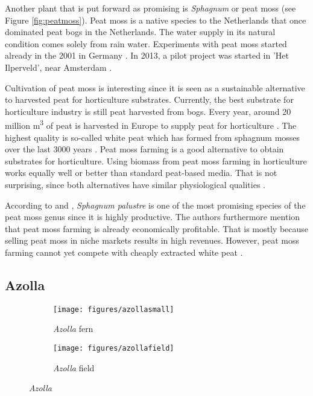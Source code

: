 \documentclass[a4paper,12pt]{scrbook}
\begin{document}
Another plant that is put forward as promising is \textit{Sphagnum} or peat moss (see Figure \ref{fig:peatmoss}). Peat moss is a native species to the Netherlands that once dominated peat bogs in the Netherlands. The water supply in its natural condition comes solely from rain water. Experiments with peat moss started already in the 2001 in Germany \citep{gaudig2014sphagnum}. In 2013, a pilot project was started in 'Het Ilperveld', near Amsterdam \citep{van2013werk}. 

Cultivation of peat moss is interesting since it is seen as a sustainable alternative to harvested peat for horticulture substrates. Currently, the best substrate for horticulture industry is still peat harvested from bogs. Every year, around 20 million m\textsuperscript{3} of peat is harvested in Europe to supply peat for horticulture \citep{altmann2008socio}. The highest quality is so-called white peat which has formed from sphagnum mosses over the last 3000 years \citep{gaudig2014sphagnum}. Peat moss farming is a good alternative to obtain substrates for horticulture. Using biomass from peat moss farming in horticulture works equally well or better than standard peat-based media. That is not surprising, since both alternatives have similar physiological qualities \citep{gaudig2014sphagnum}. 

According to \citet{gaudig2014sphagnum} and \citet{wichtmann2016paludiculture}, \textit{Sphagnum palustre} is one of the most promising species of the peat moss genus since it is highly productive. The authors furthermore mention that peat moss farming is already economically profitable. That is mostly because selling peat moss in niche markets results in high revenues. However, peat moss farming cannot yet compete with cheaply extracted white peat \citep{gaudig2014sphagnum}.

\subsection{Azolla}

\begin{figure}
    \centering
    \begin{subfigure}[a]{0.3\textwidth}
    	\texttt{[image: figures/azollasmall]} 
    	\caption{ \textit{Azolla} fern}
    	\label{fig:azollasmall}
    \end{subfigure}	
    \quad
    \begin{subfigure}[a]{0.3\textwidth}
    	\texttt{[image: figures/azollafield]} 
    	\caption{ \textit{Azolla} field}
    	\label{fig:azollafield}
    \end{subfigure}	
    \caption{ \textit{Azolla} \citep{wagner1997azolla}}
    \label{fig:azolla}
\end{figure}
\end{document}
